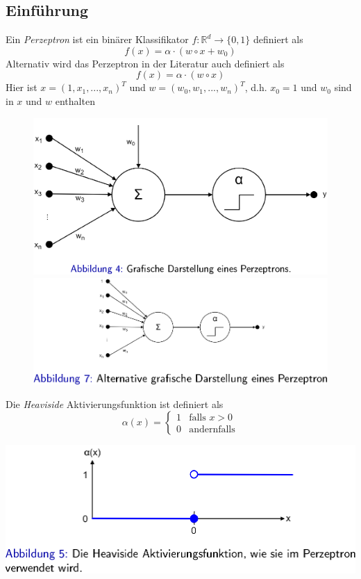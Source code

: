 \documentclass{report}
\begin{document}
\subsection{Einführung}
Ein \textit{Perzeptron} ist ein binärer Klassifikator $f: \mathbb{R}^d \rightarrow\{0,1\}$ definiert als
$$f(x) = \alpha \cdot(w\circ x + w_0)$$
Alternativ wird das Perzeptron in der Literatur auch definiert als
$$f(x) = \alpha \cdot (w\circ x)$$
Hier ist $x = (1, x_1, ..., x_n)^T$ und $w = (w_0, w_1, ..., w_n)^T$, d.h. $x_0 = 1$ und $w_0$ sind in $x$ und $w$ enthalten
\begin{figure}[H]
  \centering
  \begin{minipage}[b]{0.4\textwidth}
    \includegraphics[scale=.2]{ml04_1}
  \end{minipage}
  \hfill
  \begin{minipage}[b]{0.4\textwidth}
    \includegraphics[scale=.325]{ml04_6}
  \end{minipage}
\end{figure}

Die \textit{Heaviside} Aktivierungsfunktion ist definiert als
\begin{equation*}
  \alpha(x) = \begin{cases}
    1 & \text{falls $x > 0$}\\
    0 & \text{andernfalls}
  \end{cases}
\end{equation*}
\begin{center}
  \includegraphics[scale=.225]{ml04_2}
\end{center}
\end{document}
